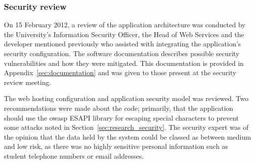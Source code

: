 \subsubsection{Security review}
\label{sec:securityreview}

On 15 February 2012, a review of the application architecture was conducted by
the University's Information Security Officer, the Head of Web Services and
the developer mentioned previously who assisted with integrating the
application's security configuration. The software documentation describes
possible security vulnerabilities and how they were mitigated. This
documentation is provided in Appendix~\ref{sec:documentation} and was given to
those present at the security review meeting.

The web hosting configuration and application security model was reviewed. Two
recommendations were made about the code; primarily, that the application
should use the \gls{owasp} ESAPI library for escaping special characters to
prevent some attacks noted in Section~\ref{sec:research_security}. The
security expert was of the opinion that the data held by the system could be
classed as between medium and low risk, as there was no highly sensitive
personal information such as student telephone numbers or email addresses.
